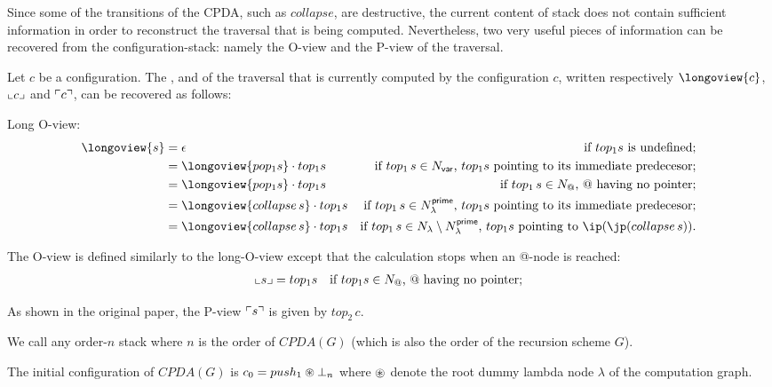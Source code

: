 \documentclass[a4paper]{article}
\theoremstyle{remark}
\theoremstyle{definition}
\begin{document}
Since some of the transitions of the CPDA, such as $collapse$, are destructive, the current content of stack does not contain sufficient information in order to reconstruct the traversal that is being computed.
Nevertheless, two very useful pieces of information can be recovered from the configuration-stack: namely the O-view and the P-view of the traversal.

Let $c$ be a configuration. The ,
 and  of the traversal that is currently computed by the configuration $c$, written respectively $\longoview{c}$, $\llcorner c \lrcorner$ and $\ulcorner c \urcorner$, can be recovered as follows:
\begin{compactitem}
\item Long O-view:
\begin{align*}
  \longoview{s} &= \epsilon & \mbox{if $top_1 s$ is undefined;} \\
      &=   \longoview{pop_1 s} \cdot top_1 s & \mbox{if $top_1\,s \in N_{\sf var}$, $top_1 s$ pointing to its immediate predecesor;} \\
      &=   \longoview{pop_1 s} \cdot top_1 s & \mbox{if $top_1\,s \in N_@$, $@$ having no pointer;} \\
      &=   \longoview{collapse\,s} \cdot top_1 s & \mbox{if $top_1\,s \in N_\lambda^{\sf prime}$, $top_1 s$ pointing to its immediate predecesor;} \\
      &=   \longoview{collapse\,s} \cdot top_1 s & \mbox{if $top_1\,s \in N_\lambda\setminus N_\lambda^{\sf prime}$, $top_1 s$ pointing to $\ip(\jp(collapse\,s))$.} \\
\end{align*}
\item The O-view is defined similarly to the long-O-view except that the calculation stops when an @-node is reached:
\begin{align*}
  \llcorner s \lrcorner  &=   top_1 s & \mbox{if $top_1 s \in N_@$, $@$ having no pointer;}
\end{align*}
\item As shown in the original paper, the P-view $\ulcorner s \urcorner$ is given by $top_2\,c$.
\end{compactitem}
\bigskip

We call  any order-$n$ stack where $n$ is the order
of $CPDA(G)$ (which is also the order of the recursion scheme $G$).

The initial configuration of $CPDA(G)$ is $c_0 = push_1 \circledast \bot_n$
where $\circledast$ denote the root dummy lambda node $\lambda$ of the computation graph.
\end{document}
